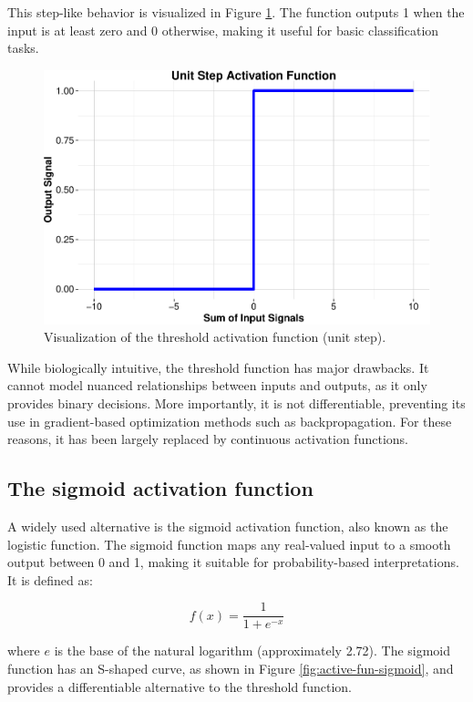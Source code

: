 \documentclass[
]{book}
\theoremstyle{definition}
\theoremstyle{definition}
\theoremstyle{definition}
\theoremstyle{definition}
\theoremstyle{remark}
\begin{document}
This step-like behavior is visualized in Figure \ref{fig:active-fun-unit}. The function outputs 1 when the input is at least zero and 0 otherwise, making it useful for basic classification tasks.

\begin{figure}

{\centering \includegraphics[width=0.5\linewidth]{nn_files/figure-latex/active-fun-unit-1} 

}

\caption{Visualization of the threshold activation function (unit step).}\label{fig:active-fun-unit}
\end{figure}

While biologically intuitive, the threshold function has major drawbacks. It cannot model nuanced relationships between inputs and outputs, as it only provides binary decisions. More importantly, it is not differentiable, preventing its use in gradient-based optimization methods such as backpropagation. For these reasons, it has been largely replaced by continuous activation functions.

\subsection*{The sigmoid activation function}\label{the-sigmoid-activation-function}

A widely used alternative is the sigmoid activation function, also known as the logistic function. The sigmoid function maps any real-valued input to a smooth output between 0 and 1, making it suitable for probability-based interpretations. It is defined as:

\[
f(x) = \frac{1}{1 + e^{-x}}
\]

where \(e\) is the base of the natural logarithm (approximately 2.72). The sigmoid function has an S-shaped curve, as shown in Figure \ref{fig:active-fun-sigmoid}, and provides a differentiable alternative to the threshold function.
\end{document}
